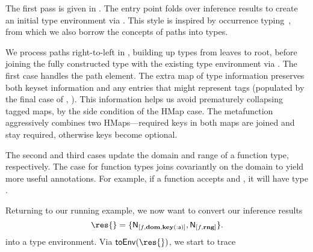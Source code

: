 \label{infer:sec:formal:inference-phase:genenv}

The first pass is given in .
The entry point \generatetenv{} folds over inference results
to create an initial type environment via \inferupdateOp{}.
This style is inspired by occurrence typing~\cite{TF10},
from which we also borrow the concepts of paths into types.

We process paths right-to-left in \inferupdateOp{}, building
up types from leaves to root, before joining the fully constructed type with the existing
type environment via \joinOp{}.
The first case handles the \keypeOp{} path element.
The extra map of type information preserves both keyset
information and any entries that might represent tags
(populated by the final case of \trackEOp{}, ).
This information helps us avoid prematurely collapsing tagged maps,
by the side condition of the HMap \joinOp{} case.
The \joinHMapOp{} metafunction aggressively combines two HMaps---required
keys in both maps are joined and stay required, otherwise keys
become optional.

The second and third \inferupdateOp{} cases update the domain and range of a function type,
respectively.
The \joinOp{} case for function types joins covariantly on the domain to yield more useful
annotations. For example, if a function accepts \IntT{} and \Keyword{},
it will have type
\joinnoalign{\arrow{\IntT{}}{\UnknownT{}}}{\arrow{\Keyword{}}{\UnknownT{}}}
{\arrow{\Union{\IntT{}}{\Keyword{}}}{\UnknownT{}}}.

Returning to our running example, we now want to convert our inference results
$$
\res{} = \{\resentry{[f, \dompe{}, \inferkeypenokeyset{[\makekw{a}]}{\makekw{a}}]}{\IntT{}}, \resentry{[f, \rngpe{}]}{\IntT{}}\}.
$$
into a type environment. Via $\generatetenv{}(\res{})$, we start to trace


